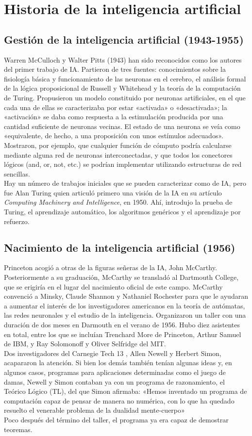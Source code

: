 \documentclass[12pt,a4paper]{report}
\begin{document}
\section{Historia de la inteligencia artificial}
\subsection*{Gestión de la inteligencia artificial (1943-1955)}
Warren McCulloch y Walter Pitts (1943) han sido reconocidos como los autores del primer trabajo de IA. Partieron de tres fuentes: conocimientos sobre la fisiología básica y funcionamiento de las neuronas en el cerebro, el análisis formal de la lógica proposicional de Russell y Whitehead y la teoría de la computación de Turing. Propusieron un modelo constituido por neuronas artificiales, en el que cada una de ellas se caracterizaba por estar «activada» o «desactivada»; la «activación» se daba como respuesta a la estimulación producida por una cantidad suficiente de neuronas vecinas. El estado de una neurona se veía como «equivalente, de hecho, a una proposición con unos estímulos adecuados». Mostraron, por ejemplo, que cualquier función de cómputo podría calcularse mediante alguna red de neuronas interconectadas, y que todos los conectores lógicos (and, or, not, etc.) se podrían implementar utilizando estructuras de red sencillas.\\
Hay un número de trabajos iniciales que se pueden caracterizar como de IA, pero fue Alan Turing quien articuló primero una visión de la IA en su artículo \textit{Computing Machinery and Intelligence}, en 1950. Ahí, introdujo la prueba de Turing, el aprendizaje automático, los algoritmos genéricos y el aprendizaje por refuerzo.
\subsection*{Nacimiento de la inteligencia artificial (1956)}

Princeton acogió a otras de la figuras señeras de la IA, John McCarthy. Posteriormente a su graduación, McCarthy se transladó al Dartmouth College, que se erigiría en el lugar del nacimiento oficial de este campo. McCarthy convenció a Minsky, Claude Shannon y Nathaniel Rochester para que le ayudaran a aumentar el interés de los investigadores americanos en la teoría de autómatas, las redes neuronales y el estudio de la inteligencia. Organizaron un taller con una duración de dos meses en Darmouth en el verano de 1956. Hubo diez asistentes en total, entre los que se incluían Trenchard More de Princeton, Arthur Samuel de IBM, y Ray Solomonoff y Oliver Selfridge del MIT.\\Dos investigadores del Carnegie Tech 13 , Allen Newell y Herbert Simon, acapararon la atención. Si bien los demás también tenían algunas ideas y, en algunos casos, programas para aplicaciones determinadas como el juego de damas, Newell y Simon contaban ya con un programa de razonamiento, el Teórico Lógico (TL), del que Simon afirmaba: «Hemos inventado un programa de computación capaz de pensar de manera no numérica, con lo que ha quedado resuelto el venerable problema de la dualidad mente-cuerpo»\\Poco después del término del taller, el programa ya era capaz de demostrar teoremas.
\end{document}

